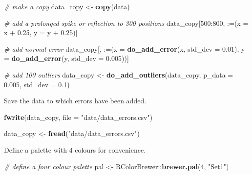 \documentclass[
]{scrreprt}
\newenvironment{Shaded}{}{}
\newcommand{\CommentTok}[1]{\textcolor[rgb]{0.38,0.63,0.69}{\textit{#1}}}
\newcommand{\DataTypeTok}[1]{\textcolor[rgb]{0.56,0.13,0.00}{#1}}
\newcommand{\DecValTok}[1]{\textcolor[rgb]{0.25,0.63,0.44}{#1}}
\newcommand{\FloatTok}[1]{\textcolor[rgb]{0.25,0.63,0.44}{#1}}
\newcommand{\KeywordTok}[1]{\textcolor[rgb]{0.00,0.44,0.13}{\textbf{#1}}}
\newcommand{\NormalTok}[1]{#1}
\newcommand{\OperatorTok}[1]{\textcolor[rgb]{0.40,0.40,0.40}{#1}}
\newcommand{\StringTok}[1]{\textcolor[rgb]{0.25,0.44,0.63}{#1}}
\begin{document}
\begin{Shaded}
\begin{Highlighting}[]
\CommentTok{\# make a copy}
\NormalTok{data\_copy <{-}}\StringTok{ }\KeywordTok{copy}\NormalTok{(data)}

\CommentTok{\# add a prolonged spike or reflection to 300 positions}
\NormalTok{data\_copy[}\DecValTok{500}\OperatorTok{:}\DecValTok{800}\NormalTok{, }\StringTok{\textasciigrave{}}\DataTypeTok{:=}\StringTok{\textasciigrave{}}\NormalTok{(}\DataTypeTok{x =}\NormalTok{ x }\OperatorTok{+}\StringTok{ }\FloatTok{0.25}\NormalTok{,}
                        \DataTypeTok{y =}\NormalTok{ y }\OperatorTok{+}\StringTok{ }\FloatTok{0.25}\NormalTok{)]}

\CommentTok{\# add normal error}
\NormalTok{data\_copy[, }\StringTok{\textasciigrave{}}\DataTypeTok{:=}\StringTok{\textasciigrave{}}\NormalTok{(}\DataTypeTok{x =} \KeywordTok{do\_add\_error}\NormalTok{(x, }\DataTypeTok{std\_dev =} \FloatTok{0.01}\NormalTok{),}
                 \DataTypeTok{y =} \KeywordTok{do\_add\_error}\NormalTok{(y, }\DataTypeTok{std\_dev =} \FloatTok{0.005}\NormalTok{))]}

\CommentTok{\# add 100 outliers}
\NormalTok{data\_copy <{-}}\StringTok{ }\KeywordTok{do\_add\_outliers}\NormalTok{(data\_copy, }\DataTypeTok{p\_data =} \FloatTok{0.005}\NormalTok{, }\DataTypeTok{std\_dev =} \FloatTok{0.1}\NormalTok{)}
\end{Highlighting}
\end{Shaded}

Save the data to which errors have been added.

\begin{Shaded}
\begin{Highlighting}[]
\KeywordTok{fwrite}\NormalTok{(data\_copy, }\DataTypeTok{file =} \StringTok{"data/data\_errors.csv"}\NormalTok{)}
\end{Highlighting}
\end{Shaded}

\begin{Shaded}
\begin{Highlighting}[]
\NormalTok{data\_copy <{-}}\StringTok{ }\KeywordTok{fread}\NormalTok{(}\StringTok{"data/data\_errors.csv"}\NormalTok{)}
\end{Highlighting}
\end{Shaded}

Define a palette with 4 colours for convenience.

\begin{Shaded}
\begin{Highlighting}[]
\CommentTok{\# define a four colour palette}
\NormalTok{pal <{-}}\StringTok{ }\NormalTok{RColorBrewer}\OperatorTok{::}\KeywordTok{brewer.pal}\NormalTok{(}\DecValTok{4}\NormalTok{, }\StringTok{"Set1"}\NormalTok{)}
\end{Highlighting}
\end{Shaded}
\end{document}
